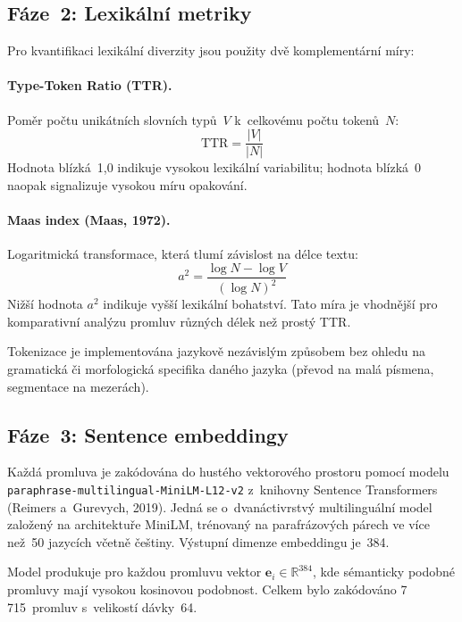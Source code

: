 \documentclass[12pt, a4paper]{article}
\newcommand{\modelname}{\texttt{paraphrase-\allowbreak{}multilingual-\allowbreak{}MiniLM-\allowbreak{}L12-\allowbreak{}v2}}
\begin{document}
\subsection{Fáze~2: Lexikální metriky}
\label{sec:lexical}

Pro kvantifikaci lexikální diverzity jsou použity dvě komplementární míry:

\paragraph{Type-Token Ratio (TTR).}
Poměr počtu unikátních slovních typů~$V$ k~celkovému počtu tokenů~$N$:
\begin{equation}
  \mathrm{TTR} = \frac{|V|}{|N|}
  \label{eq:ttr}
\end{equation}
Hodnota blízká~1{,}0 indikuje vysokou lexikální variabilitu; hodnota blízká~0
naopak signalizuje vysokou míru opakování.

\paragraph{Maas index (Maas, 1972).}
Logaritmická transformace, která tlumí závislost na délce textu:
\begin{equation}
  a^2 = \frac{\log N - \log V}{(\log N)^2}
  \label{eq:maas}
\end{equation}
Nižší hodnota $a^2$ indikuje vyšší lexikální bohatství. Tato míra je
vhodnější pro komparativní analýzu promluv různých délek než prostý TTR.

Tokenizace je implementována jazykově nezávislým způsobem bez ohledu na gramatická či morfologická specifika daného jazyka
(převod na malá písmena, segmentace na mezerách).

\subsection{Fáze~3: Sentence embeddingy}
\label{sec:embeddings}

Každá promluva je zakódována do hustého vektorového prostoru pomocí
modelu \modelname{} z~knihovny Sentence Transformers
(Reimers a~Gurevych, 2019). Jedná se o~dvanáctivrstvý
multilinguální model založený na architektuře MiniLM, trénovaný na
parafrázových párech ve více než~50 jazycích včetně češtiny. Výstupní
dimenze embeddingu je~384.

Model produkuje pro každou promluvu vektor $\mathbf{e}_i \in \mathbb{R}^{384}$,
kde sémanticky podobné promluvy mají vysokou kosinovou podobnost. Celkem bylo
zakódováno 7\,715~promluv s~velikostí dávky~64.
\end{document}
